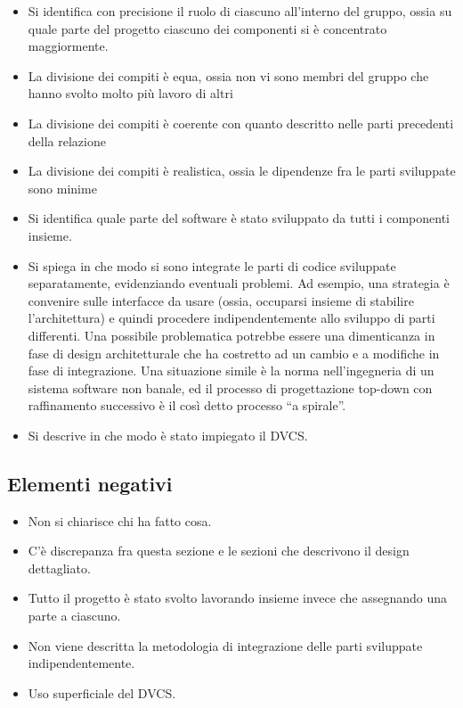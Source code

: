 \documentclass[a4paper,12pt]{report}
\begin{document}
\begin{itemize}
	\item Si identifica con precisione il ruolo di ciascuno all'interno del gruppo, ossia su quale parte del progetto ciascuno dei componenti si è concentrato maggiormente.
	\item La divisione dei compiti è equa, ossia non vi sono membri del gruppo che hanno svolto molto più lavoro di altri
	\item La divisione dei compiti è coerente con quanto descritto nelle parti precedenti della relazione
	\item La divisione dei compiti è realistica, ossia le dipendenze fra le parti sviluppate sono minime
	\item Si identifica quale parte del software è stato sviluppato da tutti i componenti insieme.
	\item Si spiega in che modo si sono integrate le parti di codice sviluppate separatamente, evidenziando eventuali problemi. Ad esempio, una strategia è convenire sulle interfacce da usare (ossia, occuparsi insieme di stabilire l'architettura) e quindi procedere indipendentemente allo sviluppo di parti differenti. Una possibile problematica potrebbe essere una dimenticanza in fase di design architetturale che ha costretto ad un cambio e a modifiche in fase di integrazione. Una situazione simile è la norma nell'ingegneria di un sistema software non banale, ed il processo di progettazione top-down con raffinamento successivo è il così detto processo ``a spirale''.
	\item Si descrive in che modo è stato impiegato il DVCS.
\end{itemize}

\subsection*{Elementi negativi}
\begin{itemize}
	\item Non si chiarisce chi ha fatto cosa.
	\item C'è discrepanza fra questa sezione e le sezioni che descrivono il design dettagliato.
	\item Tutto il progetto è stato svolto lavorando insieme invece che assegnando una parte a ciascuno.
	\item Non viene descritta la metodologia di integrazione delle parti sviluppate indipendentemente.
	\item Uso superficiale del DVCS.
\end{itemize}
\end{document}
